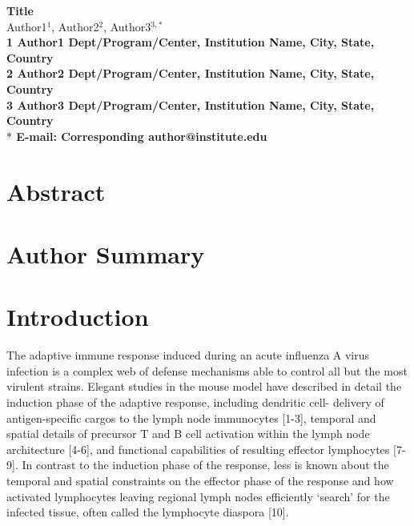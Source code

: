 \documentclass[10pt]{article}
\date{}
\begin{document}
\begin{flushleft}
{\Large
\textbf{Title}
}
\\
Author1$^{1}$, 
Author2$^{2}$, 
Author3$^{3,\ast}$
\\
\bf{1} Author1 Dept/Program/Center, Institution Name, City, State, Country
\\
\bf{2} Author2 Dept/Program/Center, Institution Name, City, State, Country
\\
\bf{3} Author3 Dept/Program/Center, Institution Name, City, State, Country
\\
$\ast$ E-mail: Corresponding author@institute.edu
\end{flushleft}

\section*{Abstract}

\section*{Author Summary}

\section*{Introduction}

The adaptive immune response induced during an acute influenza A virus infection is a complex web of defense mechanisms able to control all but the most virulent strains.  Elegant studies in the mouse model have described in detail the induction phase of the adaptive response, including dendritic cell- delivery of antigen-specific cargos to the lymph node immunocytes [1-3], temporal and spatial details of precursor T and B cell activation within the lymph node architecture [4-6], and functional capabilities of resulting effector lymphocytes [7-9].  In contrast to the induction phase of the response, less is known about the temporal and spatial constraints on the effector phase of the response and how activated lymphocytes leaving regional lymph nodes efficiently ‘search’ for the infected tissue, often called the lymphocyte diaspora [10]. 
\end{document}
